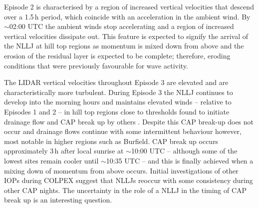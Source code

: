\documentclass[times]{qjrms4}
\begin{document}
Episode 2 is characterised by a region of increased vertical velocities that descend over a 1.5$\,\mbox{h}$ period, which coincide with an acceleration in the ambient wind. By $\sim$02:00 UTC the ambient winds stop accelerating and a region of increased vertical velocities dissipate out. This feature is expected to signify the arrival of the NLLJ at hill top regions as momentum is mixed down from above and the erosion of the residual layer is expected to be complete; therefore, eroding conditions that were previously favourable for wave activity.

The LIDAR vertical velocities throughout Episode 3 are elevated and are characteristically more turbulent. During Episode 3 the NLLJ continues to develop into the morning hours and maintains elevated winds -- relative to Episodes 1 and 2 -- in hill top regions close to thresholds found to initiate drainage flow and CAP break up by others \citep{barr1989influence,orgill1992mesoscale,bogren2000local,iijima2000seasonal,whiteman2001cold,vosper2008numerical}.  Despite this CAP break-up does not occur and drainage flows continue with some intermittent behaviour however, most notable in higher regions such as Burfield. CAP break up occurs approximately 3$\,\mbox{h}$ after local sunrise at $\sim$10:00 UTC -- although some of the lowest sites remain cooler until $\sim$10:35 UTC -- and this is finally achieved when a mixing down of momentum from above occurs. Initial investigations of other IOPs during COLPEX suggest that NLLJs reoccur with some consistency during other CAP nights. The uncertainty in the role of a NLLJ in the timing of CAP break up is an interesting question.
\end{document}
